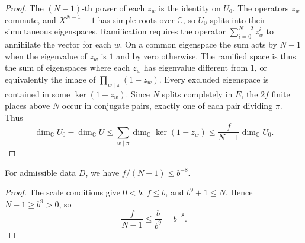 \begin{proof}
The $(N-1)$-th power of each $z_w$ is the identity on $U_0$. The operators $z_w$ commute, and $X^{N-1}-1$ has simple roots over $\mathbb C$, so $U_0$ splits into their simultaneous eigenspaces. Ramification requires the operator $\sum_{i=0}^{N-2}z_w^i$ to annihilate the vector for each $w$. On a common eigenspace the sum acts by $N-1$ when the eigenvalue of $z_w$ is $1$ and by zero otherwise. The ramified space is thus the sum of eigenspaces where each $z_w$ has eigenvalue different from $1$, or equivalently the image of $\prod_{w\mid\pi}(1-z_w)$. Every excluded eigenspace is contained in some $\ker(1-z_w)$. Since $N$ splits completely in $E$, the $2f$ finite places above $N$ occur in conjugate pairs, exactly one of each pair dividing $\pi$. Thus
\[
 \dim_{\mathbb C}U_0-\dim_{\mathbb C}U
 \le \sum_{w\mid\pi}\dim_{\mathbb C}\ker(1-z_w)
 \le \frac{f}{N-1}\dim_{\mathbb C}U_0 .
\]
\end{proof}

\begin{lemma}
\label{lem:a-ramified-loss-scale}
\emitthmsource
For admissible data $D$, we have $f/(N-1)\le b^{-8}$.
\end{lemma}
\begin{proof}
The scale conditions give $0<b$, $f\le b$, and $b^9+1\le N$. Hence $N-1\ge b^9>0$, so
\[
 \frac{f}{N-1}\le\frac{b}{b^9}=b^{-8}.
\]
\end{proof}

